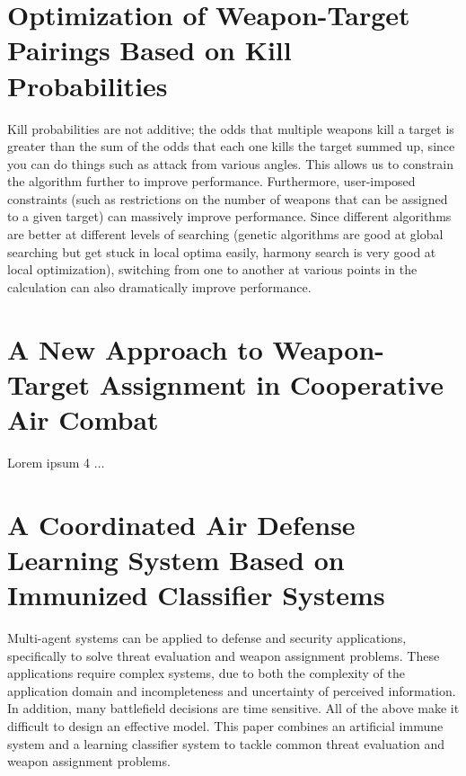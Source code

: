\documentclass[12pt]{article} %
\begin{document}
\section*{Optimization of Weapon-Target Pairings Based on Kill Probabilities \cite{killProbs_bogdanowicz_2013}}
    Kill probabilities are not additive; the odds that multiple weapons kill a target is greater than the sum of the odds that each one kills the target summed up, since you can do things such as attack from various angles. This allows us to constrain the algorithm further to improve performance. Furthermore, user-imposed constraints (such as restrictions on the number of weapons that can be assigned to a given target) can massively improve performance. Since different algorithms are better at different levels of searching (genetic algorithms are good at global searching but get stuck in local optima easily, harmony search is very good at local optimization), switching from one to another at various points in the calculation can also dramatically improve performance.   


\section*{A New Approach to Weapon-Target Assignment in Cooperative Air Combat \cite{swarmHarmony_chang_2017}}
Lorem ipsum 4 $\ldots$


\section*{A Coordinated Air Defense Learning System Based on Immunized Classifier Systems \cite{immunized_nantogma_2021}}
    
    Multi-agent systems can be applied to defense and security applications, specifically to solve threat evaluation and weapon assignment problems. These applications require complex systems, due to both the complexity of the application domain and incompleteness and uncertainty of perceived information. In addition, many battlefield decisions are time sensitive. All of the above make it difficult to design an effective model. This paper combines an artificial immune system and a learning classifier system to tackle common threat evaluation and weapon assignment problems. 
    
\end{document}
